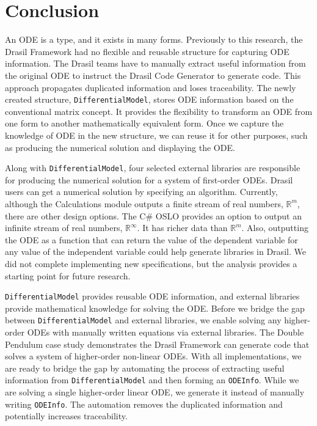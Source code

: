 \chapter{Conclusion}
An ODE is a type, and it exists in many forms. Previously to this research, the Drasil Framework had no flexible and reusable structure for capturing ODE information. The Drasil teams have to manually extract useful information from the original ODE to instruct the Drasil Code Generator to generate code. This approach propagates duplicated information and loses traceability. The newly created structure, \verb|DifferentialModel|, stores ODE information based on the conventional matrix concept. It provides the flexibility to transform an ODE from one form to another mathematically equivalent form. Once we capture the knowledge of ODE in the new structure, we can reuse it for other purposes, such as producing the numerical solution and displaying the ODE.

Along with \verb|DifferentialModel|, four selected external libraries are responsible for producing the numerical solution for a system of first-order ODEs. Drasil users can get a numerical solution by specifying an algorithm. Currently, although the Calculations module outputs a finite stream of real numbers, $\mathbb{R}^m$, there are other design options. The C\# OSLO provides an option to output an infinite stream of real numbers, $\mathbb{R}^{\infty}$. It has richer data than $\mathbb{R}^m$. Also, outputting the ODE as a function that can return the value of the dependent variable for any value of the independent variable could help generate libraries in Drasil. We did not complete implementing new specifications, but the analysis provides a starting point for future research.

\verb|DifferentialModel| provides reusable ODE information, and external libraries provide mathematical knowledge for solving the ODE. Before we bridge the gap between \verb|DifferentialModel| and external libraries, we enable solving any higher-order ODEs with manually written equations via external libraries. The Double Pendulum case study demonstrates the Drasil Framework can generate code that solves a system of higher-order non-linear ODEs. With all implementations, we are ready to bridge the gap by automating the process of extracting useful information from \verb|DifferentialModel| and then forming an \verb|ODEInfo|. While we are solving a single higher-order linear ODE, we generate it instead of manually writing \verb|ODEInfo|. The automation removes the duplicated information and potentially increases traceability.

